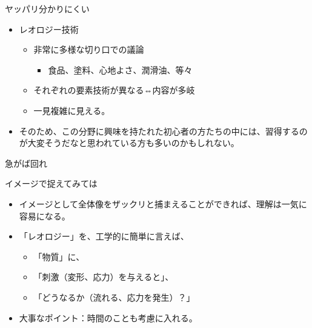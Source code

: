\begin{frame}

\begin{block}{ヤッパリ分かりにくい}

\begin{itemize}

\item
  レオロジー技術

  \begin{itemize}
  
  \item
    非常に多様な切り口での議論

    \begin{itemize}
    
    \item
      食品、塗料、心地よさ、潤滑油、等々
    \end{itemize}
  \item
    それぞれの要素技術が異なる⇔内容が多岐
  \item
    一見複雑に見える。
  \end{itemize}
\item
  そのため、この分野に興味を持たれた初心者の方たちの中には、習得するのが大変そうだなと思われている方も多いのかもしれない。
\end{itemize}

\end{block}

\end{frame}

\begin{frame}{急がば回れ}

\end{frame}

\begin{frame}

\begin{block}{イメージで捉えてみては}

\begin{itemize}

\item
  イメージとして全体像をザックリと捕まえることができれば、理解は一気に容易になる。
\item
  「レオロジー」を、工学的に簡単に言えば、

  \begin{itemize}
  
  \item
    「物質」に、
  \item
    「刺激（変形、応力）を与えると」、
  \item
    「どうなるか（流れる、応力を発生）？」
  \end{itemize}
\item
  {大事なポイント：時間のことも考慮に入れる。}
\end{itemize}

\end{block}

\end{frame}

